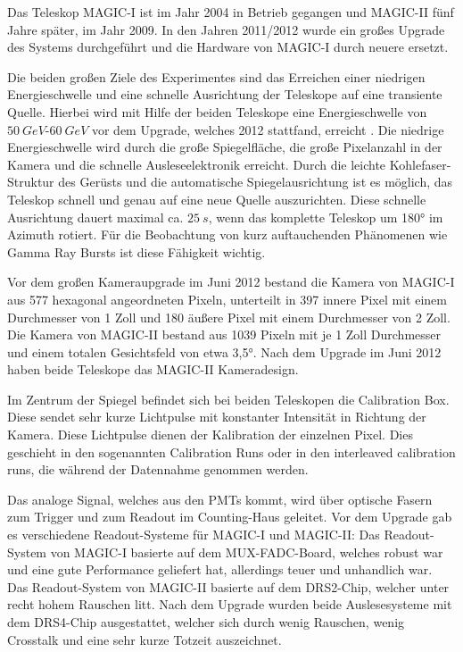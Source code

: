 Das Teleskop MAGIC-I ist im Jahr 2004 in Betrieb gegangen und MAGIC-II fünf Jahre später, im Jahr 2009.
In den Jahren 2011/2012 wurde ein großes Upgrade des Systems durchgeführt und die Hardware von MAGIC-I durch neuere ersetzt.

Die beiden großen Ziele des Experimentes sind das Erreichen einer niedrigen Energieschwelle und eine schnelle Ausrichtung der Teleskope auf eine transiente Quelle.
Hierbei wird mit Hilfe der beiden Teleskope eine Energieschwelle von $\SI{50}{GeV}$-$\SI{60}{GeV}$ vor dem Upgrade, welches 2012 stattfand, erreicht \cite{MAGIC_Telescopes}.
Die niedrige Energieschwelle wird durch die große Spiegelfläche, die große Pixelanzahl in der Kamera und die schnelle Ausleseelektronik erreicht.
Durch die leichte Kohlefaser-Struktur des Gerüsts und die automatische Spiegelausrichtung ist es möglich, das Teleskop schnell und genau auf eine neue Quelle auszurichten.
Diese schnelle Ausrichtung dauert maximal ca. $\SI{25}{s}$, wenn das komplette Teleskop um 180° im Azimuth rotiert.
Für die Beobachtung von kurz auftauchenden Phänomenen wie Gamma Ray Bursts ist diese Fähigkeit wichtig. 

Vor dem großen Kameraupgrade im Juni 2012 bestand die Kamera von MAGIC-I aus 577 hexagonal angeordneten Pixeln, unterteilt in 397 innere Pixel mit einem Durchmesser von 1 Zoll und 180 äußere Pixel mit einem Durchmesser von 2 Zoll.
Die Kamera von MAGIC-II bestand aus 1039 Pixeln mit je 1 Zoll Durchmesser und einem totalen Gesichtsfeld von etwa 3,5°.
Nach dem Upgrade im Juni 2012 haben beide Teleskope das MAGIC-II Kameradesign. \cite{MAGIC-Upgrade}

Im Zentrum der Spiegel befindet sich bei beiden Teleskopen die Calibration Box.
Diese sendet sehr kurze Lichtpulse mit konstanter Intensität in Richtung der Kamera.
Diese Lichtpulse dienen der Kalibration der einzelnen Pixel.
Dies geschieht in den sogenannten Calibration Runs oder in den interleaved calibration runs, die während der Datennahme genommen werden.

Das analoge Signal, welches aus den PMTs kommt, wird über optische Fasern zum Trigger und zum Readout im Counting-Haus geleitet.
Vor dem Upgrade gab es verschiedene Readout-Systeme für MAGIC-I und MAGIC-II:
Das Readout-System von MAGIC-I basierte auf dem MUX-FADC-Board, welches robust war und eine gute Performance geliefert hat, allerdings teuer und unhandlich war.
Das Readout-System von MAGIC-II basierte auf dem DRS2-Chip, welcher unter recht hohem Rauschen litt.
Nach dem Upgrade wurden beide Auslesesysteme mit dem DRS4-Chip ausgestattet, welcher sich durch wenig Rauschen, wenig Crosstalk und eine sehr kurze Totzeit auszeichnet.\cite{MAGIC-Upgrade}

